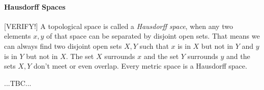 \paragraph{Hausdorff Spaces} [VERIFY!] A topological space is called a \emph{Hausdorff space}, when any two elements $x,y$ of that space can be separated by disjoint open sets. That means we can always find two disjoint open sets $X,Y$ such that $x$ is in $X$ but not in $Y$ and $y$ is in $Y$ but not in $X$. The set $X$ surrounds $x$ and the set $Y$ surrounds $y$ and the sets $X,Y$ don't meet or even overlap. Every metric space is a Hausdorff space.

...TBC...



\begin{comment}

Zusammenhang zwischen normierten, metrischen und topologischen Räumen
https://www.youtube.com/watch?v=3j8GIJd5-3A&list=PLHi0WgifODX19zsJhvCrizYEXiHY5qc9n

Definition of closeness or neighborhood: two elements $x,y$ of $X$ are close to each other iff there exists an open set that contains both $x$ and $y$

A topology is a collection of open sets.



\end{comment}